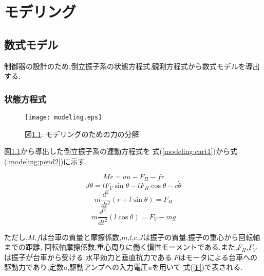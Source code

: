 \documentclass[a4j,11pt,twoside]{jbook}
\begin{document}


\chapter{モデリング}
\label{chapter_modeling}
\section{数式モデル}
制御器の設計のため,倒立振子系の状態方程式,観測方程式から数式モデルを導出する.

\subsection{状態方程式}

\begin{figure}[htbp]
    \begin{center}
        \texttt{[image: modeling.eps]}
        \caption{図\ref{modeling}: モデリングのための力の分解}
        \label{modeling}
    \end{center}
\end{figure}

図\ref{modeling}から導出した倒立振子系の運動方程式を
式(\ref{modeling:cart1})から式(\ref{modeling:pend2})に示す.

\begin{equation}
    M \ddot{r} = au - F_{H} - f \dot{r}
    \label{modeling:cart1}
\end{equation}
\begin{equation}
    J \ddot{\theta} = lF_{V}\sin{\theta} - lF_{H}\cos{\theta} - c \dot{\theta}
    \label{modeling:pend1}
\end{equation}
\begin{equation}
    m\frac{d^2}{dt^2}(r + l\sin{\theta}) = F_{H}
    \label{modeling:cart2}
\end{equation}
\begin{equation}
    m\frac{d^2}{dt^2}(l\cos{\theta}) = F_{V} - mg
    \label{modeling:pend2}
\end{equation}

ただし,$M$,$f$は台車の質量と摩擦係数,$m$,$l$,$c$,$J$は振子の質量,振子の重心から回転軸までの距離,
回転軸摩擦係数,重心周りに働く慣性モーメントである.また,$F_{H}$,$F_{V}$は振子が台車から受ける
水平効力と垂直抗力である.$F$はモータによる台車への駆動力であり,定数$a$,駆動アンプへの入力電圧$u$を用いて
式(\ref{F})で表される.
\end{document}
